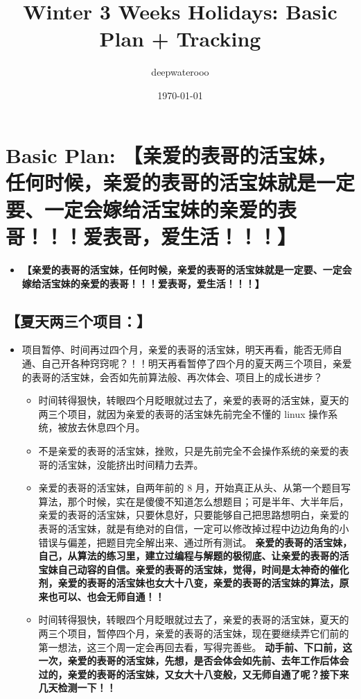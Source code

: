 \documentclass[9pt, b5paper]{article}
\author{deepwaterooo}
\date{\today}
\title{Winter 3 Weeks Holidays: Basic Plan + Tracking}
\begin{document}
\maketitle
\tableofcontents


\section{Basic Plan: \textbf{【亲爱的表哥的活宝妹，任何时候，亲爱的表哥的活宝妹就是一定要、一定会嫁给活宝妹的亲爱的表哥！！！爱表哥，爱生活！！！】}}
\label{sec-1}
\begin{itemize}
\item \textbf{【亲爱的表哥的活宝妹，任何时候，亲爱的表哥的活宝妹就是一定要、一定会嫁给活宝妹的亲爱的表哥！！！爱表哥，爱生活！！！】}
\end{itemize}
\subsection{\textbf{【夏天两三个项目：】}}
\label{sec-1-1}
\begin{itemize}
\item 项目暂停、时间再过四个月，亲爱的表哥的活宝妹，明天再看，能否无师自通、自己开各种窍窍呢？！！明天再看暂停了四个月的夏天两三个项目，亲爱的表哥的活宝妹，会否如先前算法般、再次体会、项目上的成长进步？
\begin{itemize}
\item 时间转得狠快，转眼四个月眨眼就过去了，亲爱的表哥的活宝妹，夏天的两三个项目，就因为亲爱的表哥的活宝妹先前完全不懂的 linux 操作系统，被放去休息四个月。
\item 不是亲爱的表哥的活宝妹，挫败，只是先前完全不会操作系统的亲爱的表哥的活宝妹，没能挤出时间精力去弄。
\item 亲爱的表哥的活宝妹，自两年前的 8 月，开始真正从头、从第一个题目写算法，那个时候，实在是傻傻不知道怎么想题目；可是半年、大半年后，亲爱的表哥的活宝妹，只要休息好，只要能够自己把思路想明白，亲爱的表哥的活宝妹，就是有绝对的自信，一定可以修改掉过程中边边角角的小错误与偏差，把题目完全解出来、通过所有测试。 \textbf{亲爱的表哥的活宝妹，自己，从算法的练习里，建立过编程与解题的极彻底、让亲爱的表哥的活宝妹自己动容的自信。亲爱的表哥的活宝妹，觉得，时间是太神奇的催化剂，亲爱的表哥的活宝妹也女大十八变，亲爱的表哥的活宝妹的算法，原来也可以、也会无师自通！！}
\item 时间转得狠快，转眼四个月眨眼就过去了，亲爱的表哥的活宝妹，夏天的两三个项目，暂停四个月，亲爱的表哥的活宝妹，现在要继续弄它们前的第一想法，这三个周一定会再回去看，写得完善些。 \textbf{动手前、下口前，这一次，亲爱的表哥的活宝妹，先想，是否会体会如先前、去年工作后体会过的，亲爱的表哥的活宝妹，又女大十八变般，又无师自通了呢？接下来几天检测一下！！}
\end{itemize}
\end{itemize}
\end{document}
